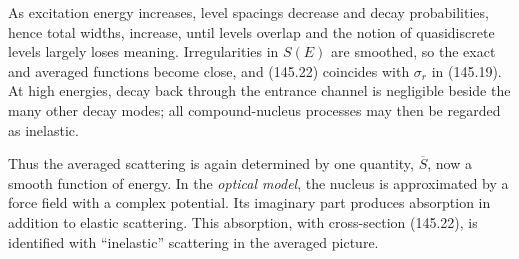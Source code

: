 As excitation energy increases, level spacings decrease and decay
probabilities, hence total widths, increase, until levels overlap and the
notion of quasidiscrete levels largely loses meaning. Irregularities in
$S(E)$ are smoothed, so the exact and averaged functions become close, and
(145.22) coincides with $\sigma_r$ in (145.19). At high energies, decay back
through the entrance channel is negligible beside the many other decay modes;
all compound-nucleus processes may then be regarded as inelastic.

Thus the averaged scattering is again determined by one quantity,
$\overline S$, now a smooth function of energy. In the \emph{optical model},
the nucleus is approximated by a force field with a complex potential. Its
imaginary part produces absorption in addition to elastic scattering. This
absorption, with cross-section (145.22), is identified with ``inelastic''
scattering in the averaged picture.
